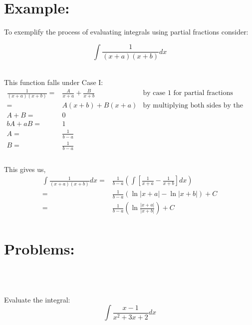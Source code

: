 \documentclass[10pt,letterpaper,cm]{hmcpset}
\begin{document}
\section*{Example:}
To exemplify the process of evaluating integrals using partial fractions consider:


\begin{problem}

  \begin{equation*}
    \int\frac{1}{(x+a)(x+b)}dx 
  \end{equation*}
\end{problem}\\
  This function falls under Case I:
  \begin{align*}
      \frac{1}{(x+a)(x+b)} =& \frac{A}{x+a} + \frac{B}{x+b} & \text{by case 1 for partial fractions}\\
       =&A(x+b) + B(x+a) &\text{by multiplying both sides by the denominator}\\
   A+B =& 0 \\
   bA + aB=& 1 \\
   A =&\frac{1}{b-a} \\ 
   B =&\frac{1}{b-a} \\
  \end{align*}
\\
This gives us,
\begin{align*}
  \int\frac{1}{(x+a)(x+b)}dx=&\frac{1}{b-a}\left(  \int\left[ \frac{1}{x+a}- \frac{1}{x+b}\right] 
  dx\right)\\
  =&\frac{1}{b-a}\left(\ln|x+a|-\ln|x+b|\right)+C\\
  =& \frac{1}{b-a}\left(\ln\frac{|x+a|}{|x+b|}\right)+C \\
\end{align*}
\section*{Problems:}\\
\\
\begin{problem}[1]
  Evaluate the integral:
    \begin{equation*}
      \int\frac{x-1}{x^2 + 3x + 2}dx
    \end{equation*}
\end{problem}\\
\end{document}
